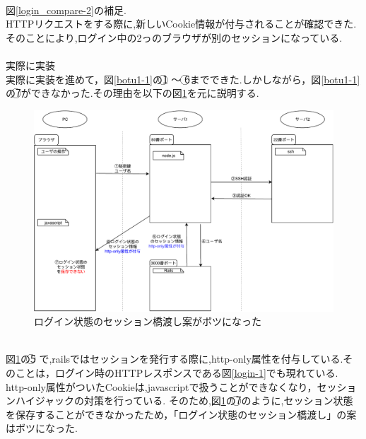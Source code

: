 \\
図\ref{login_compare-2}の補足.\\
HTTPリクエストをする際に,新しいCookie情報が付与されることが確認できた.そのことにより,ログイン中の2っのブラウザが別のセッションになっている.
\\\\
\noindent 実際に実装\\
実際に実装を進めて，図\ref{botu1-1}の\textcircled{\scriptsize 1} 〜 \textcircled{\scriptsize 6}までできた.しかしながら，図\ref{botu1-1}の\textcircled{\scriptsize 7}ができなかった.その理由を以下の図\ref{botu1-2.pdf}を元に説明する.
\begin{figure}[h]
    \includegraphics[width=13cm]{fig/chapter3/botu1-2.pdf}
    \caption{ログイン状態のセッション橋渡し案がボツになった} 
    \label{botu1-2.pdf}
\end{figure}
\\
図\ref{botu1-2.pdf}の\textcircled{\scriptsize 5} で,railsではセッションを発行する際に,http-only属性を付与している\cite{cookie-httponly-default}.そのことは，ログイン時のHTTPレスポンスである図\ref{login-1}でも現れている.
http-only属性がついたCookieは,javascriptで扱うことができなくなり，セッションハイジャックの対策を行っている\cite{cookie-httponly-security}.
そのため,図\ref{botu1-2.pdf}の\textcircled{\scriptsize 7}のように,セッション状態を保存することができなかったため，「ログイン状態のセッション橋渡し」の案はボツになった.
%
%
